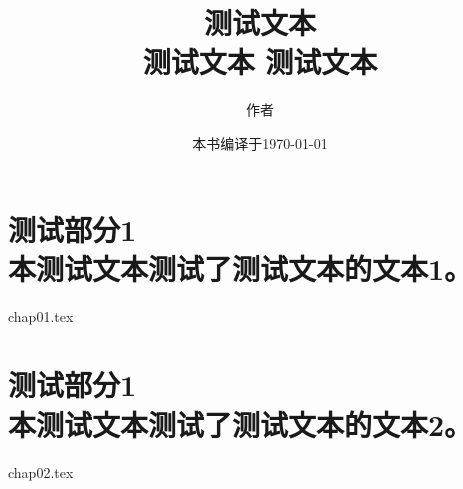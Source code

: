 \documentclass[UTF8,a5paper,zihao=-4,titlepage,oneside]{ctexbook}
\begin{document}
\title{
    测试文本 \\
    测试文本 测试文本}
\author{作者}
\date{本书编译于\today}

\maketitle

\tableofcontents

\frontmatter

\mainmatter

\setlength{\parskip}{0.5em}

\part[测试部分1]
     {测试部分1\\[\bigskipamount] 
      {\normalfont \normalsize 本测试文本测试了测试文本的文本1。}}

{chap01.tex}
% 

\part[测试部分2]
     {测试部分1\\[\bigskipamount] 
      {\normalfont \normalsize 本测试文本测试了测试文本的文本2。}}

{chap02.tex}

\setlength{\parskip}{0pt}
\end{document}
